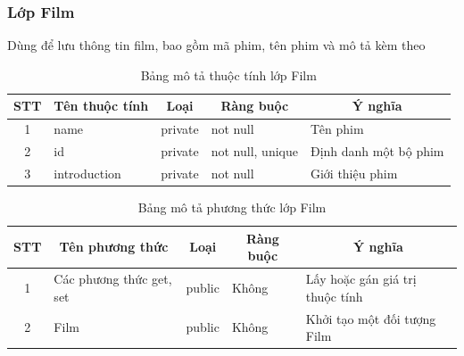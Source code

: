 \documentclass[a4paper, 12pt]{article}
\begin{document}
\subsubsection{Lớp Film}
Dùng để lưu thông tin film, bao gồm mã phim, tên phim và mô tả kèm theo
\begin{table}[H]
	\begin{center}
		\begin{tabular}{|c|l|l|l|l|}
			\hline
			STT                     & \multicolumn{1}{c|}{Tên thuộc tính} & \multicolumn{1}{c|}{Loại}    & \multicolumn{1}{c|}{Ràng buộc} & \multicolumn{1}{c|}{Ý nghĩa} \\ \hline
			1                       & name                                & \multicolumn{1}{c|}{private} & not null                       & Tên phim                     \\ \hline
			2                       & id                                  & private                      & not null, unique               & Định danh một bộ phim        \\ \hline
			3			   		    & introduction                        & private                      &         not null                       & Giới thiệu phim              \\ \hline
			\end{tabular}
			\caption{Bảng mô tả thuộc tính lớp Film}
	\end{center}
\end{table}

\begin{table}[H]
	\begin{center}
		\begin{tabular}{|c|l|c|l|l|}
			\hline
			STT & \multicolumn{1}{c|}{Tên phương thức} & Loại                        & \multicolumn{1}{c|}{Ràng buộc} & \multicolumn{1}{c|}{Ý nghĩa}    \\ \hline
			1   & Các phương thức get, set             & public                      &            Không                    & Lấy hoặc gán giá trị thuộc tính \\ \hline
			2   & Film                                 & \multicolumn{1}{l|}{public} &                 Không               & Khởi tạo một đối tượng Film     \\ \hline
			\end{tabular}
			\caption{Bảng mô tả phương thức lớp Film}
	\end{center}
\end{table}
\end{document}
